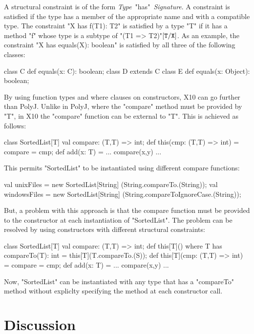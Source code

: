 \documentclass[preprint,nocopyrightspace,9pt]{sigplanconf}
\begin{document}
A structural constraint is of the form \emph{Type}~\xcd"has"~\emph{Signature}.
A constraint is satisfied if the type has a member of the appropriate name
and with a compatible type.
The constraint \xcd"X has f(T1): T2"
is satisfied by a type \xcd"T" if it has a method \xcd"f"
whose type is a subtype of \xcd"(T1 => T2)"$[{\tt T}/{\tt X}]$.
As an example,
the constraint \xcd"X has equals(X): boolean"
is satisfied by all three of the following classes:
\begin{xten}
class C { def equals(x: C): boolean; }
class D extends C { }
class E { def equals(x: Object): boolean; }
\end{xten}

By using function types and where clauses on constructors,
X10 can go further than PolyJ.
Unlike in PolyJ, where the \xcd"compare" method must be provided by \xcd"T",
in X10 the \xcd"compare" function can be external to \xcd"T".
This is achieved as follows:
\begin{xten}
class SortedList[T] {
    val compare: (T,T) => int;
    def this(cmp: (T,T) => int) = { compare = cmp; }
    def add(x: T) = { ... compare(x,y) ... }
}
\end{xten}

This permits
\xcd"SortedList" to be instantiated using different compare functions:
\begin{xten}
val unixFiles    = new SortedList[String]
                        (String.compareTo.(String));
val windowsFiles = new SortedList[String]
                        (String.compareToIgnoreCase.(String));
\end{xten}

But, a problem with this approach is that the compare function must be
provided to the constructor at each instantiation of \xcd"SortedList".
The problem can be resolved by using constructors with different
structural constraints:
\begin{xten}
class SortedList[T] {
    val compare: (T,T) => int;
    def this[T]() where T has compareTo(T): int = {
        this[T](T.compareTo.(S));
    }
    def this[T](cmp: (T,T) => int) = { compare = cmp; }
    def add(x: T) = { ... compare(x,y) ... }
}
\end{xten}
Now, \xcd"SortedList" can be instantiated with any type that has
a \xcd"compareTo"
method without expliclty specifying the method at each constructor call.

\section{Discussion}
\end{document}
